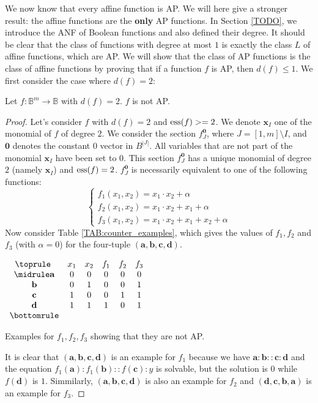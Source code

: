 We now know that every affine function is AP. We will here give a stronger
result: the affine functions are the \textbf{only} AP functions.
In Section \ref{TODO}, we introduce the ANF of Boolean functions and also
defined their degree. It should be clear that the class of functions with
degree at most $1$ is exactly the class $L$ of affine functions, which are AP.
We will show that the class of AP functions is the class of affine functions by
proving that if a function $f$ is AP, then $d(f)\leq 1$. We first consider the
case where $d(f) = 2$:

\begin{property} \label{degree_2_not_AP}
 Let $f\colon \mathbb{B}^m\to \mathbb{B}$ with $d(f)=2$. $f$ is not AP.
\end{property}
\begin{proof}
  Let's consider $f$ with $d(f) = 2$ and $\operatorname{ess}(f) >= 2$. We denote $\mathbf{x}_I$ one of the
  monomial of $f$ of degree $2$. We consider the section $f^{\mathbf{0}}_J$,
  where $J = [1, m] \setminus I$,  and $\mathbf{0}$ denotes the constant 0
  vector in $B^{|J|}$. All variables that are not part of the monomial
  $\mathbf{x}_I$ have been set to $0$. This section $f^{\mathbf{0}}_J$ has a
  unique monomial of degree $2$ (namely $\mathbf{x}_I$) and $\operatorname{ess}(f) = 2$.
  $f^{\mathbf{0}}_J$ is necessarily equivalent to one of the following
  functions:
  $$
  \begin{cases}
    f_1(x_1, x_2) = x_1 \cdot x_2 + \alpha \\
    f_2(x_1, x_2) = x_1 \cdot x_2 + x_1 + \alpha\\
    f_3(x_1, x_2) = x_1 \cdot x_2 + x_1 + x_2 + \alpha
  \end{cases}$$
  Now consider Table \ref{TAB:counter_examples}, which gives the values of
  $f_1, f_2$ and $f_3$ (with $\alpha = 0$) for the four-tuple $(\mathbf{a},
  \mathbf{b}, \mathbf{c}, \mathbf{d})$.
  \begin{table}[ht]
    \center
  $\begin{array}{cccccc}
    \toprule
    ~ & x_1 & x_2 & f_1 & f_2 & f_3\\
    \midrule
    \mathbf{a} & 0 & 0 & 0 & 0 & 0\\
    \mathbf{b} & 0 & 1 & 0 & 0 & 1\\
    \mathbf{c} & 1 & 0 & 0 & 1 & 1\\
    \mathbf{d} & 1 & 1 & 1 & 0 & 1\\
    \bottomrule
  \end{array}
  $\bigskip
  \caption{Examples for $f_1, f_2, f_3$ showing that they are not AP.}
  \label{TAB:counter_examples}
  \end{table}
  It is clear that $(\mathbf{a},\mathbf{b}, \mathbf{c}, \mathbf{d})$ is an
  example for $f_1$ because we have $\mathbf{a} : \mathbf{b} :: \mathbf{c} :
  \mathbf{d}$ and the equation $f_1(\mathbf{a}) :  f_1(\mathbf{b}) ::
  f(\mathbf{c}) : y$ is solvable, but the solution is $0$ while $f(\mathbf{d})$
  is $1$. Simmilarly, $(\mathbf{a},\mathbf{b}, \mathbf{c}, \mathbf{d})$ is also
  an example for $f_2$ and $(\mathbf{d},\mathbf{c}, \mathbf{b}, \mathbf{a})$ is
  an example for $f_3$.



\end{proof}
